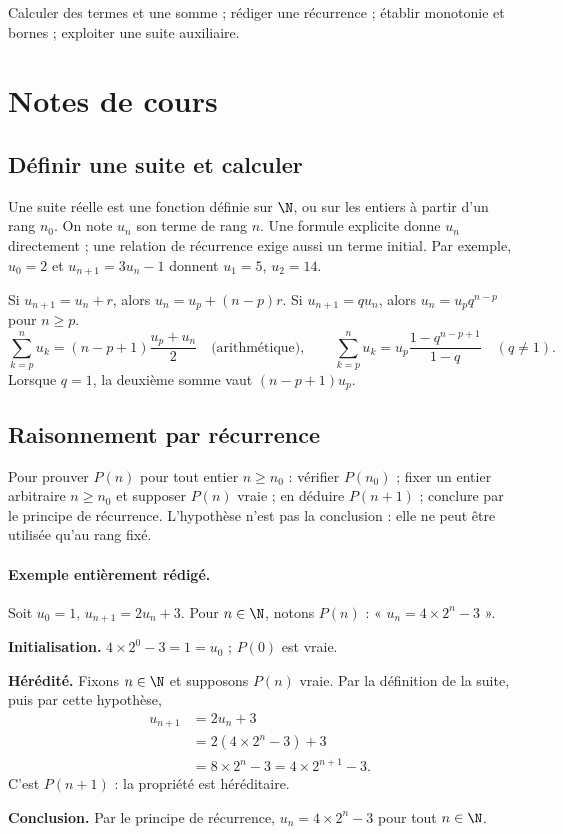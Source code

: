 \label{ch:1}


\begin{keypoint}[Objectifs]Calculer des termes et une somme ; rédiger une récurrence ; établir monotonie et bornes ; exploiter une suite auxiliaire.\end{keypoint}

\section{Notes de cours}
\subsection{Définir une suite et calculer}
Une suite réelle est une fonction définie sur $\N$, ou sur les entiers à partir d'un rang $n_0$. On note $u_n$ son terme de rang $n$. Une formule explicite donne $u_n$ directement ; une relation de récurrence exige aussi un terme initial. Par exemple, $u_0=2$ et $u_{n+1}=3u_n-1$ donnent $u_1=5$, $u_2=14$.
\begin{keypoint}
Si $u_{n+1}=u_n+r$, alors $u_n=u_p+(n-p)r$. Si $u_{n+1}=qu_n$, alors $u_n=u_pq^{n-p}$ pour $n\ge p$.
\[\sum_{k=p}^n u_k=(n-p+1)\frac{u_p+u_n}{2}\quad\text{(arithmétique)},\qquad
\sum_{k=p}^n u_k=u_p\frac{1-q^{n-p+1}}{1-q}\quad(q\ne1).\]
Lorsque $q=1$, la deuxième somme vaut $(n-p+1)u_p$.
\end{keypoint}
\subsection{Raisonnement par récurrence}
Pour prouver $P(n)$ pour tout entier $n\ge n_0$ : vérifier $P(n_0)$ ; fixer un entier arbitraire $n\ge n_0$ et supposer $P(n)$ vraie ; en déduire $P(n+1)$ ; conclure par le principe de récurrence. L'hypothèse n'est pas la conclusion : elle ne peut être utilisée qu'au rang fixé.
\paragraph{Exemple entièrement rédigé.} Soit $u_0=1$, $u_{n+1}=2u_n+3$. Pour $n\in\N$, notons $P(n)$ : « $u_n=4\times2^n-3$ ».
\par\smallskip\textbf{Initialisation.} $4\times2^0-3=1=u_0$ ; $P(0)$ est vraie.
\par\smallskip\textbf{Hérédité.} Fixons $n\in\N$ et supposons $P(n)$ vraie. Par la définition de la suite, puis par cette hypothèse,
\[\begin{aligned}u_{n+1}&=2u_n+3\\&=2(4\times2^n-3)+3\\&=8\times2^n-3=4\times2^{n+1}-3.\end{aligned}\]
C'est $P(n+1)$ : la propriété est héréditaire.
\par\smallskip\textbf{Conclusion.} Par le principe de récurrence, $u_n=4\times2^n-3$ pour tout $n\in\N$.

